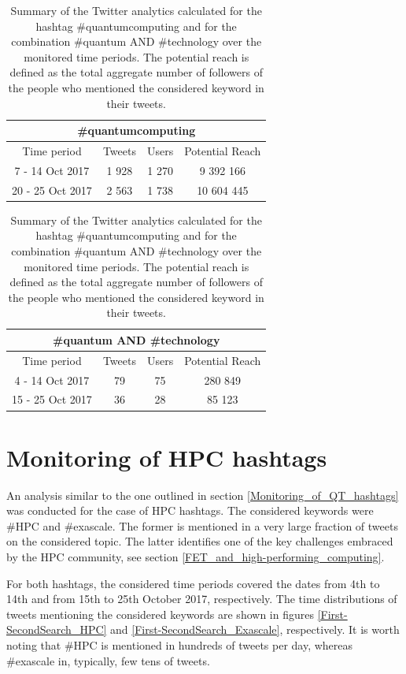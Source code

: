 \begin{table}[t]
 \begin{center}
 
  \begin{tabular}{cccc}
   \hline 
   \hline
   \multicolumn{4}{c}{\#quantumcomputing}\\
   \hline
   \hline
   Time period & Tweets & Users & Potential Reach \\ 
   \hline
   7 - 14 Oct 2017 & 1 928 & 1 270 & 9 392 166  \\
   20 - 25 Oct 2017 & 2 563 & 1 738 & 10 604 445  \\
   \hline
   \hline
  \end{tabular}

  \bigskip

  \begin{tabular}{cccc}
   \hline 
   \hline
   \multicolumn{4}{c}{\#quantum AND \#technology}\\
   \hline 
   \hline
   Time period & Tweets & Users & Potential Reach \\ 
   \hline
   4 - 14 Oct 2017 & 79 & 75 & 280 849  \\
   15 - 25 Oct 2017 & 36 & 28 & 85 123  \\
   \hline
   \hline
  \end{tabular}
 \end{center} 
 \caption{Summary of the Twitter analytics calculated for the hashtag \#quantumcomputing and for the combination \#quantum AND \#technology over the monitored time periods. The potential reach is defined as the total aggregate number of followers of the people who mentioned the considered keyword in their tweets.}
\label{Summary_QuantumComputing-Technology} 
\end{table}    

\section{Monitoring of HPC hashtags} \label{Monitoring_of_HPC_hashtags}
An analysis similar to the one outlined in section \ref{Monitoring_of_QT_hashtags} was conducted for the case of HPC hashtags. The considered keywords were \#HPC and \#exascale. The former is mentioned in a very large fraction of tweets on the considered topic. The latter identifies one of the key challenges embraced by the HPC community, see section \ref{FET_and_high-performing_computing}.    

For both hashtags, the considered time periods covered the dates from 4th to 14th and from 15th to 25th October 2017, respectively. The time distributions of tweets mentioning the considered keywords are shown in figures \ref{First-SecondSearch_HPC} and \ref{First-SecondSearch_Exascale}, respectively. It is worth noting that \#HPC is mentioned in hundreds of tweets per day, whereas \#exascale in, typically, few tens of tweets. 

